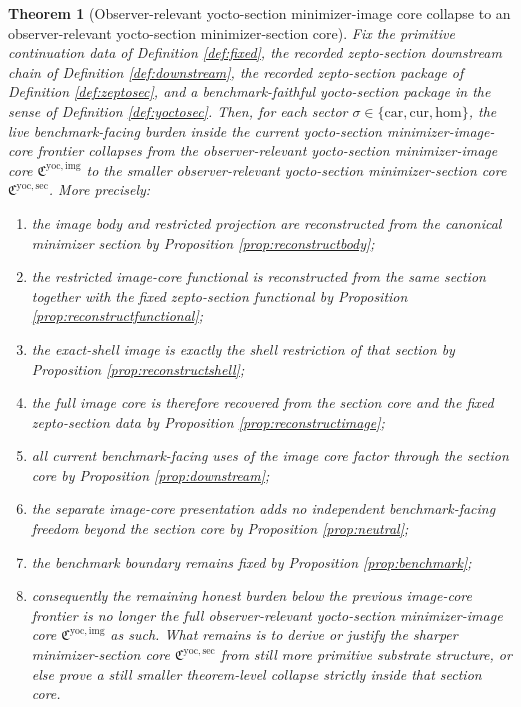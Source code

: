 \documentclass[11pt]{article}
\newcommand{\Car}{\mathrm{car}}
\newcommand{\Cur}{\mathrm{cur}}
\newcommand{\Hom}{\mathrm{hom}}
\newcommand{\YoctoImageCore}{\mathfrak C^{\mathrm{yoc,img}}}
\newcommand{\YoctoMinSectionCore}{\mathfrak C^{\mathrm{yoc,sec}}}
\newtheorem{theorem}{Theorem}
\begin{document}
\begin{theorem}[Observer-relevant yocto-section minimizer-image core collapse to an observer-relevant yocto-section minimizer-section core]
\label{thm:main}
Fix the primitive continuation data of Definition \ref{def:fixed}, the recorded zepto-section downstream chain of Definition \ref{def:downstream}, the recorded zepto-section package of Definition \ref{def:zeptosec}, and a benchmark-faithful yocto-section package in the sense of Definition \ref{def:yoctosec}. Then, for each sector \(\sigma\in\{\Car,\Cur,\Hom\}\), the live benchmark-facing burden inside the current yocto-section minimizer-image-core frontier collapses from the observer-relevant yocto-section minimizer-image core \(\YoctoImageCore\) to the smaller observer-relevant yocto-section minimizer-section core \(\YoctoMinSectionCore\). More precisely:
\begin{enumerate}
    \item the image body and restricted projection are reconstructed from the canonical minimizer section by Proposition \ref{prop:reconstructbody};
    \item the restricted image-core functional is reconstructed from the same section together with the fixed zepto-section functional by Proposition \ref{prop:reconstructfunctional};
    \item the exact-shell image is exactly the shell restriction of that section by Proposition \ref{prop:reconstructshell};
    \item the full image core is therefore recovered from the section core and the fixed zepto-section data by Proposition \ref{prop:reconstructimage};
    \item all current benchmark-facing uses of the image core factor through the section core by Proposition \ref{prop:downstream};
    \item the separate image-core presentation adds no independent benchmark-facing freedom beyond the section core by Proposition \ref{prop:neutral};
    \item the benchmark boundary remains fixed by Proposition \ref{prop:benchmark};
    \item consequently the remaining honest burden below the previous image-core frontier is no longer the full observer-relevant yocto-section minimizer-image core \(\YoctoImageCore\) as such. What remains is to derive or justify the sharper minimizer-section core \(\YoctoMinSectionCore\) from still more primitive substrate structure, or else prove a still smaller theorem-level collapse strictly inside that section core.
\end{enumerate}
\end{theorem}
\end{document}
